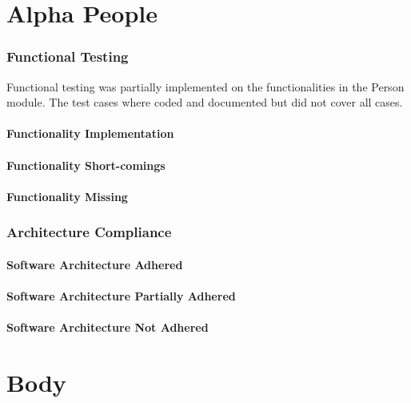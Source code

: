 \documentclass{article}
\begin{document}
\newpage
\section{Alpha People}
\subsubsection{Functional Testing}
    Functional testing was partially implemented on the functionalities in the Person module. The test cases where coded and documented but did not cover all cases.
\paragraph{Functionality Implementation}
\paragraph{Functionality Short-comings}
\paragraph{Functionality Missing}

\subsubsection{Architecture Compliance}
\paragraph{Software Architecture Adhered}
\paragraph{Software Architecture Partially Adhered}
\paragraph{Software Architecture Not Adhered}

\newpage
\section{Body}
\lipsum[1]
\end{document}
